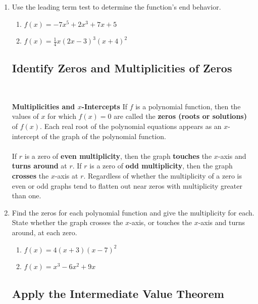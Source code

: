 \clearpage

\begin{enumerate}

\item Use the leading term test to determine the function's end behavior.


\begin{enumerate}
\item $f(x)=-7x^5+2x^3+7x+5$
\vfill

\item $f(x)=\frac{1}{4}x(2x-3)^3(x+4)^2$
\vfill

\end{enumerate}

\subsection{Identify Zeros and Multiplicities of Zeros} ~

\begin{boxthm}
{\bf Multiplicities and $x$-Intercepts}
If $f$ is a polynomial function, then the values of $x$ for which $f(x)=0$ are called the \textbf{zeros (roots or solutions)} of $f(x)$.  Each real root of the polynomial equations appears as an $x$-intercept of the graph of the polynomial function.\\
\\
If $r$ is a zero of \textbf{even multiplicity}, then the graph \textbf{touches} the $x$-axis and \textbf{turns around} at $r$.  If $r$ is a zero of \textbf{odd multiplicity}, then the graph \textbf{crosses} the $x$-axis at $r$.  Regardless of whether the multiplicity of a zero is even or odd graphs tend to flatten out near zeros with multiplicity greater than one.
\end{boxthm}




\item Find the zeros for each polynomial function and give the multiplicity for each.  State whether the graph crosses the $x$-axis, or touches the $x$-axis and turns around, at each zero.

\begin{enumerate}
\item $f(x)=4(x+3)(x-7)^2$
\vfill
\item $f(x)=x^3-6x^2+9x$
\vfill
\end{enumerate}


\newpage

\subsection{Apply the Intermediate Value Theorem} ~


\end{enumerate}
